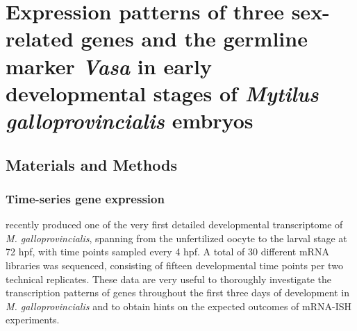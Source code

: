 \documentclass[../main.tex]{subfiles}
\begin{document}
{
\chapter{Expression patterns of three sex-related genes and the germline marker \textit{Vasa} in early developmental stages of \textit{Mytilus galloprovincialis} embryos}
\label{inSitu}


\vspace{5mm}




\vspace{5mm}

}

\newpage

\section{Materials and Methods} \label{chapter4_MM}
\subsection{Time-series gene expression} \label{chapter4_MM_rnaseq}
\textbf{\cite{miglioli2024hcrMytilus}} recently produced one of the very first detailed developmental transcriptome of \textit{M. galloprovincialis}, spanning from the unfertilized oocyte to the larval stage at 72 hpf, with time points sampled every 4 hpf. A total of 30 different mRNA libraries was sequenced, consisting of fifteen developmental time points per two technical replicates. These data are very useful to thoroughly investigate the transcription patterns of genes throughout the first three days of development in \textit{M. galloprovincialis} and to obtain hints on the expected outcomes of mRNA-ISH experiments.
\end{document}

